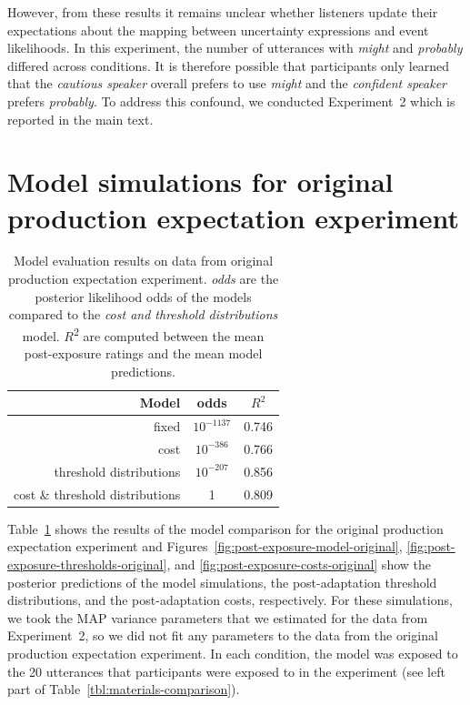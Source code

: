 \documentclass[man, floatsintext]{apa6}
\begin{document}
However, from these results it remains unclear whether listeners update their expectations about the mapping between uncertainty expressions and event likelihoods. In this experiment, the number of utterances with \textit{might} and \textit{probably} differed across conditions. It is therefore possible that participants only learned that the {\it cautious speaker} overall prefers to use {\it might} and the {\it confident speaker} prefers {\it probably}. To address this confound, we conducted Experiment~2 which is reported in the main text.

\section{Model simulations for original production expectation experiment}
\setcounter{section}{6}


\begin{table}
\center
\begin{tabular}{r | c | c }
Model &   odds  &  $R^2$ \\ \midrule
fixed & $10^{-1137}$ &  0.746       \\
cost & $10^{-386}$ & 0.766     \\
threshold distributions & $10^{-207}$ &  0.856 \\
cost \& threshold distributions & 1 &  0.809 \\
\end{tabular}
\caption{Model evaluation results on data from original production expectation experiment.   \textit{odds} are the posterior likelihood odds of the models compared to the \textit{cost and threshold distributions} model.  $R$\textsuperscript{$2$} are computed between  the mean post-exposure ratings and the mean model predictions. \label{tbl:model-comparison-orig}}
\end{table}


Table~\ref{tbl:model-comparison-orig} shows the results of the model comparison  for the original production expectation experiment and  Figures~\ref{fig:post-exposure-model-original}, \ref{fig:post-exposure-thresholds-original}, and \ref{fig:post-exposure-costs-original} show the posterior predictions
of the model simulations, the post-adaptation threshold distributions, and the post-adaptation costs, respectively. For these simulations, we took the MAP variance parameters that we estimated for the data from Experiment~2, so we did not fit any parameters to the data from the original production expectation experiment. In each condition, the model was exposed to the 20 utterances that participants were exposed to in the experiment (see left part of Table~\ref{tbl:materials-comparison}).
\end{document}
